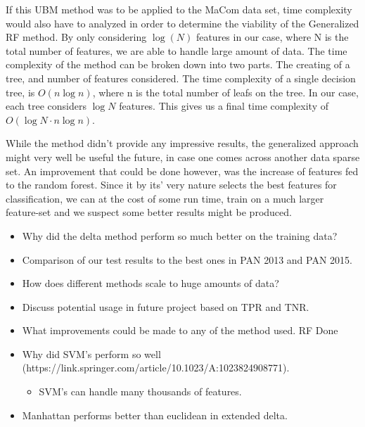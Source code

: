 If this \gls{UBM} method was to be applied to the MaCom data set, time complexity would
also have to analyzed in order to determine the viability of the Generalized RF 
method.
By only considering $\log(N)$ features in our case, 
where N is the total number of features, we are able to handle large amount of data. 
The time complexity of the method can be broken down into two parts.
The creating of a tree, and number of features considered.
The time complexity of a single decision tree, is $O(n \log{n})$, where n is the
total number of leafs on the tree. In our case,
each tree considers $\log{N}$ features. This gives us a final time 
complexity of $O(\log{N} \cdot n \log{n})$.\cite{RFTime}

While the method didn't provide any impressive results, the generalized approach
might very well be useful the future, in case one comes across another data
sparse set. An improvement that could be done however, was the increase of 
features fed to the random forest. Since it by its' very nature
selects the best features for classification, we can at the cost of 
some run time, train on a much larger feature-set and we suspect
some better results might be produced.





\begin{itemize}
    \item Why did the delta method perform so much better on the training data?
    \item Comparison of our test results to the best ones in PAN 2013 and PAN
        2015.
    \item How does different methods scale to huge amounts of data?
    \item Discuss potential usage in future project based on TPR and TNR.
    \item What improvements could be made to any of the method used. RF Done
    \item Why did SVM's perform so well (https://link.springer.com/article/10.1023/A:1023824908771).
        \begin{itemize}
            \item SVM's can handle many thousands of features.
        \end{itemize}
    \item Manhattan performs better than euclidean in extended delta.
\end{itemize}
